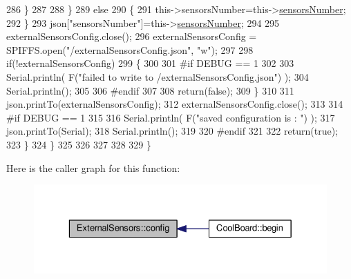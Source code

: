 \begin{DoxyCode}
286                 \}
287  
288             \}
289             \textcolor{keywordflow}{else}
290             \{
291                 this->sensorsNumber=this->\hyperlink{class_external_sensors_a58e4fbf9adeae787d92be5fa33043b5d}{sensorsNumber};
292             \}
293             json[\textcolor{stringliteral}{"sensorsNumber"}]=this->\hyperlink{class_external_sensors_a58e4fbf9adeae787d92be5fa33043b5d}{sensorsNumber};
294 
295             externalSensorsConfig.close();
296             externalSensorsConfig = SPIFFS.open(\textcolor{stringliteral}{"/externalSensorsConfig.json"}, \textcolor{stringliteral}{"w"});
297 
298             \textcolor{keywordflow}{if}(!externalSensorsConfig)
299             \{
300             
301 \textcolor{preprocessor}{            #if DEBUG == 1 }
302 
303                 Serial.println( F(\textcolor{stringliteral}{"failed to write to /externalSensorsConfig.json"}) );
304                 Serial.println();
305             
306 \textcolor{preprocessor}{            #endif}
307 
308                 \textcolor{keywordflow}{return}(\textcolor{keyword}{false});
309             \}
310             
311             json.printTo(externalSensorsConfig);
312             externalSensorsConfig.close();
313             
314 \textcolor{preprocessor}{        #if DEBUG == 1 }
315 
316             Serial.println( F(\textcolor{stringliteral}{"saved configuration is : "}) );
317             json.printTo(Serial);
318             Serial.println();
319         
320 \textcolor{preprocessor}{        #endif}
321 
322             \textcolor{keywordflow}{return}(\textcolor{keyword}{true}); 
323         \}
324     \}   
325     
326 
327 
328 
329 \}
\end{DoxyCode}
Here is the caller graph for this function\+:\nopagebreak
\begin{figure}[H]
\begin{center}
\leavevmode
\includegraphics[width=329pt]{d1/d2f/class_external_sensors_a862a4bd11346b37270d0244c2adabe5a_icgraph}
\end{center}
\end{figure}
\mbox{\label{class_external_sensors_ac829858f587e15a3fcb00567248f0edd}} 
